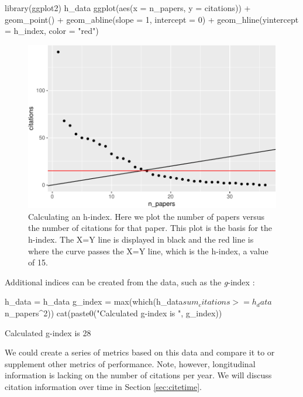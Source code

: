 \begin{Schunk}
\begin{Sinput}
library(ggplot2)
h_data %
  ggplot(aes(x = n_papers, y = citations)) + 
  geom_point() + geom_abline(slope = 1, intercept = 0) + 
  geom_hline(yintercept = h_index, color = "red")
\end{Sinput}
\begin{figure}
\includegraphics{muschelli_files/figure-latex/unnamed-chunk-14-1} \caption[Calculating an h-index]{Calculating an h-index.  Here we plot the number of papers versus the number of citations for that paper.  This plot is the basis for the h-index.  The X=Y line is displayed in black and the red line is where the curve passes the X=Y line, which is the h-index, a value of 15.}\label{fig:unnamed-chunk-14}
\end{figure}
\end{Schunk}

Additional indices can be created from the data, such as the
\emph{g}-index \citep{egghe2006theory}:

\begin{Schunk}
\begin{Sinput}
h_data = h_data %
g_index = max(which(h_data$sum_citations >= h_data$n_papers^2))
cat(paste0("Calculated g-index is ", g_index))
\end{Sinput}
\begin{Soutput}
Calculated g-index is 28
\end{Soutput}
\end{Schunk}

We could create a series of metrics based on this data and compare it to
or supplement other metrics of performance. Note, however, longitudinal
information is lacking on the number of citations per year. We will
discuss citation information over time in Section \ref{sec:citetime}.

